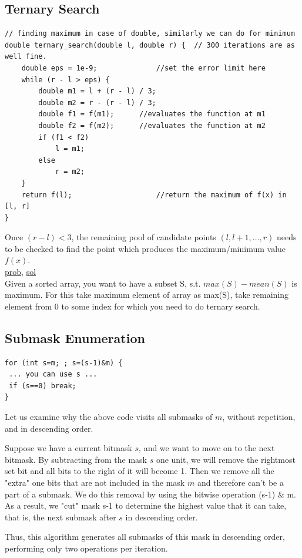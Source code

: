 \documentclass[8pt, a4paper, oneside, twocolumn]{extarticle}
\begin{document}
\subsection{Ternary Search}
\begin{verbatim}
// finding maximum in case of double, similarly we can do for minimum
double ternary_search(double l, double r) {  // 300 iterations are as well fine.
    double eps = 1e-9;              //set the error limit here
    while (r - l > eps) {
        double m1 = l + (r - l) / 3;
        double m2 = r - (r - l) / 3;
        double f1 = f(m1);      //evaluates the function at m1
        double f2 = f(m2);      //evaluates the function at m2
        if (f1 < f2)
            l = m1;
        else
            r = m2;
    }
    return f(l);                    //return the maximum of f(x) in [l, r]
}
\end{verbatim}
Once $(r - l) < 3$, the remaining pool of candidate points $(l, l + 1, \ldots, r)$ needs to be checked to find the point which produces the maximum/minimum value $f(x)$.
\\\href{https://codeforces.com/contest/185/problem/B}{prob}, \href{https://codeforces.com/contest/185/submission/1654904}{sol}
\\Given a sorted array, you want to have a subset S, s.t. $max(S) - mean(S)$ is maximum. For this take maximum element of array as max(S), take remaining element from 0 to some index for which you need to do ternary search.
\subsection{Submask Enumeration}
\begin{verbatim}
for (int s=m; ; s=(s-1)&m) {
 ... you can use s ...
 if (s==0) break;
}
\end{verbatim}
Let us examine why the above code visits all submasks of $m$, without repetition, and in descending order.

Suppose we have a current bitmask $s$, and we want to move on to the next bitmask. By subtracting from the mask $s$ one unit, we will remove the rightmost set bit and all bits to the right of it will become 1. Then we remove all the "extra" one bits that are not included in the mask $m$ and therefore can't be a part of a submask. We do this removal by using the bitwise operation (s-1) \& m. As a result, we "cut" mask s-1 to determine the highest value that it can take, that is, the next submask after $s$ in descending order.

Thus, this algorithm generates all submasks of this mask in descending order, performing only two operations per iteration.
\end{document}

